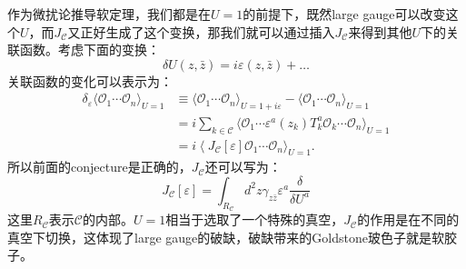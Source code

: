 作为微扰论推导软定理，我们都是在$U=1$的前提下，既然large gauge可以改变这个$U$，而$J_\mathcal{C}$又正好生成了这个变换，那我们就可以通过插入$J_\mathcal{C}$来得到其他$U$下的关联函数。考虑下面的变换：
\begin{equation}
	\delta U(z,\bar{z})=i\varepsilon(z,\bar{z})+\ldots
\end{equation}
关联函数的变化可以表示为：
\begin{equation}
	\begin{aligned}
		\delta_{\varepsilon}\langle\mathcal{O}_{1}\cdots\mathcal{O}_{n}\rangle_{U=1}& \equiv\langle\mathcal{O}_1\cdots\mathcal{O}_n\rangle_{U=1+i\varepsilon}-\langle\mathcal{O}_1\cdots\mathcal{O}_n\rangle_{U=1}  \\
		&=i\sum_{k\in\mathcal{C}}\langle\mathcal{O}_1\cdots\varepsilon^a(z_k)T_k^a\mathcal{O}_k\cdots\mathcal{O}_n\rangle_{U=1} \\
		&=i\left<J_{\mathcal{C}}[\varepsilon]\mathcal{O}_{1}\cdots\mathcal{O}_{n}\right.\rangle_{U=1}.
	\end{aligned}
\end{equation}
所以前面的conjecture是正确的，$J_\mathcal{C}$还可以写为：
\begin{equation}
	J_{\mathcal{C}}[\varepsilon]=\int_{R_{\mathcal{C}}}d^2z\gamma_{z\bar{z}}\varepsilon^a\frac\delta{\delta U^a}
\end{equation}
这里$R_\mathcal{C}$表示$\mathcal{C}$的内部。$U=1$相当于选取了一个特殊的真空，$J_\mathcal{C}$的作用是在不同的真空下切换，这体现了large gauge的破缺，破缺带来的Goldstone玻色子就是软胶子。

